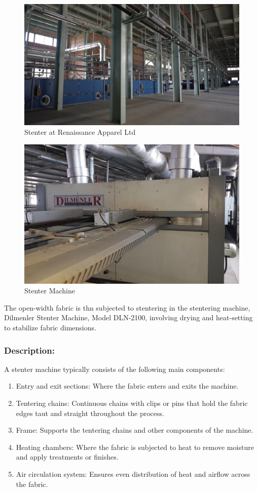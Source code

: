 \begin{figure}[h!]
  \centering
  \includegraphics[width=0.8\linewidth]{figs/stenter.jpg}
  \caption{Stenter at Renaissance Apparel Ltd}
  \label{fig:stenter}
\end{figure}

\begin{figure}[h!]
  \centering
  \includegraphics[width=0.8\linewidth]{figs/production/image3.jpg}
  \caption{Stenter Machine}
  \label{fig:Stenter Machine}
\end{figure}

The open-width fabric is thn subjected to stentering in the stentering machine, Dilmenler Stenter Machine, Model DLN-2100, 
involving drying and heat-setting to stabilize fabric dimensions.


\subsubsection{Description:}


A stenter machine typically consists of the following main components:


\begin{enumerate}
\item
  Entry and exit sections: Where the fabric enters and exits the
  machine.
\item
  Tentering chains: Continuous chains with clips or pins that hold the
  fabric edges taut and straight throughout the process.
\item
  Frame: Supports the tentering chains and other components of the
  machine.
\item
  Heating chambers: Where the fabric is subjected to heat to remove
  moisture and apply treatments or finishes.
\item
  Air circulation system: Ensures even distribution of heat and airflow
  across the fabric.
\end{enumerate}

